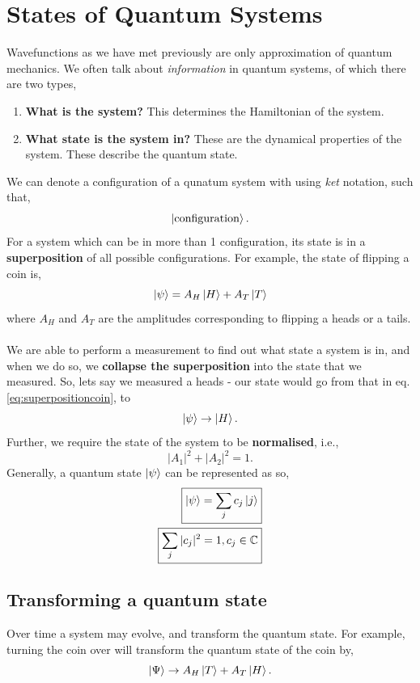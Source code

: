 \documentclass{book}
\begin{document}
\section{States of Quantum Systems}
Wavefunctions as we have met previously are only approximation of quantum mechanics. We often talk about \textit{information} in quantum systems, of which there are two types,
\begin{enumerate}
	\item \textbf{What is the system?} This determines the Hamiltonian of the system.
	\item \textbf{What state is the system in?} These are the dynamical properties of the system. These describe the quantum state.
\end{enumerate}
We can denote a configuration of a qunatum system with using \textit{ket} notation, such that,
\begin{equation}
	\ket{\text{configuration}}.
\end{equation}
For a system which can be in more than 1 configuration, its state is in a \textbf{superposition} of all possible configurations. For example, the state of flipping a coin is,
\begin{equation}
	\ket{\psi} = A_H\ket{H} + A_T\ket{T} \label{eq:superpositioncoin}
\end{equation}
where $A_H$ and $A_T$ are the amplitudes corresponding to flipping a heads or a tails.
\\\\
We are able to perform a measurement to find out what state a system is in, and when we do so, we \textbf{collapse the superposition} into the state that we measured. So, lets say we measured a heads - our state would go from that in eq. \eqref{eq:superpositioncoin}, to
\begin{equation}
	\ket{\psi} \to \ket{H}.
\end{equation}
Further, we require the state of the system to be \textbf{normalised}, i.e.,
\begin{equation}
	|A_1|^2 + |A_2|^2 = 1.
\end{equation}
Generally, a quantum state $\ket{\psi}$ can be represented as so,
\begin{align}
	\boxed{\ket{\psi} = \sum_j c_j\ket{j}} \\
	\boxed{\sum_j|c_j|^2 = 1, c_j \in \mathbb{C}}
\end{align}
\subsection{Transforming a quantum state}
Over time a system may evolve, and transform the quantum state. For example, turning the coin over will transform the quantum state of the coin by,
\begin{equation}
	\ket{\Psi} \to A_H\ket{T} + A_T\ket{H}.
\end{equation}
\end{document}
